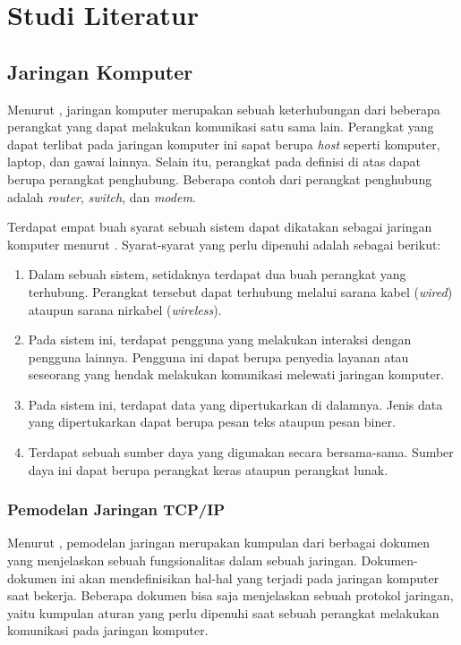 \chapter{Studi Literatur}

\section{Jaringan Komputer}
Menurut \textcite{forouzan2012}, jaringan komputer merupakan sebuah keterhubungan dari beberapa perangkat yang dapat melakukan komunikasi satu sama lain. Perangkat yang dapat terlibat pada jaringan komputer ini sapat berupa \emph{host} seperti komputer, laptop, dan gawai lainnya. Selain itu, perangkat pada definisi di atas dapat berupa perangkat penghubung. Beberapa contoh dari perangkat penghubung adalah \emph{router}, \emph{switch}, dan \emph{modem}.

Terdapat empat buah syarat sebuah sistem dapat dikatakan sebagai jaringan komputer menurut \textcite{pratama2015}. Syarat-syarat yang perlu dipenuhi adalah sebagai berikut:
\begin{enumerate}
  \item Dalam sebuah sistem, setidaknya terdapat dua buah perangkat yang terhubung. Perangkat tersebut dapat terhubung melalui sarana kabel (\emph{wired}) ataupun sarana nirkabel (\emph{wireless}).
  \item Pada sistem ini, terdapat pengguna yang melakukan interaksi dengan pengguna lainnya. Pengguna ini dapat berupa penyedia layanan atau seseorang yang hendak melakukan komunikasi melewati jaringan komputer.
  \item Pada sistem ini, terdapat data yang dipertukarkan di dalamnya. Jenis data yang dipertukarkan dapat berupa pesan teks ataupun pesan biner.
  \item Terdapat sebuah sumber daya yang digunakan secara bersama-sama. Sumber daya ini dapat berupa perangkat keras ataupun perangkat lunak.
\end{enumerate}

\subsection{Pemodelan Jaringan TCP/IP}
Menurut \textcite{odom2022}, pemodelan jaringan merupakan kumpulan dari berbagai dokumen yang menjelaskan sebuah fungsionalitas dalam sebuah jaringan. Dokumen-dokumen ini akan mendefinisikan hal-hal yang terjadi pada jaringan komputer saat bekerja. Beberapa dokumen bisa saja menjelaskan sebuah protokol jaringan, yaitu kumpulan aturan yang perlu dipenuhi saat sebuah perangkat melakukan komunikasi pada jaringan komputer.

